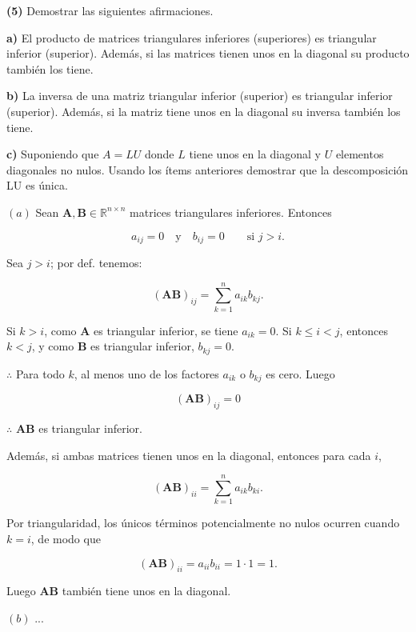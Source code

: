 \documentclass[12pt]{article}
\begin{document}
\pagebreak 

\begin{myframe}
    \textbf{(5)} Demostrar las siguientes afirmaciones.

\medskip

\textbf{a)} El producto de matrices triangulares inferiores (superiores) es triangular inferior (superior). Además, si las matrices tienen unos en la diagonal su producto también los tiene.

\medskip

\textbf{b)} La inversa de una matriz triangular inferior (superior) es triangular inferior (superior). Además, si la matriz tiene unos en la diagonal su inversa también los tiene.

\medskip

\textbf{c)} Suponiendo que \(A = LU\) donde \(L\) tiene unos en la diagonal y \(U\) elementos diagonales no nulos. Usando los ítems anteriores demostrar que la descomposición LU es única.
\end{myframe}

$(a)$ Sean $\mathbf A,\mathbf B \in \mathbb R^{n\times n}$ matrices triangulares
inferiores. Entonces

\[
a_{ij}=0 \quad \text{y} \quad b_{ij}=0 \qquad \text{si } j>i.
\]

Sea $j > i$; por def. tenemos:

\[
(\mathbf{AB})_{ij}
=
\sum_{k=1}^n a_{ik}b_{kj}.
\]

Si $k>i$, como $\mathbf A$ es triangular inferior, se tiene $a_{ik}=0$. Si $k\le i<j$, entonces $k<j$, y como $\mathbf B$ es triangular inferior,
$b_{kj}=0$.

$\therefore $ Para todo $k$, al menos uno de los factores $a_{ik}$ o $b_{kj}$
es cero. Luego

\[
(\mathbf{AB})_{ij}=0
\]

$\therefore $ $\mathbf{AB}$ es triangular inferior.

Además, si ambas matrices tienen unos en la diagonal, entonces para cada $i$,

\[
(\mathbf{AB})_{ii}
=
\sum_{k=1}^n a_{ik}b_{ki}.
\]

Por triangularidad, los únicos términos potencialmente no nulos ocurren cuando
$k=i$, de modo que

\[
(\mathbf{AB})_{ii}=a_{ii}b_{ii}=1\cdot1=1.
\]

Luego $\mathbf{AB}$ también tiene unos en la diagonal.

$(b)$ ...

\pagebreak 
\end{document}
